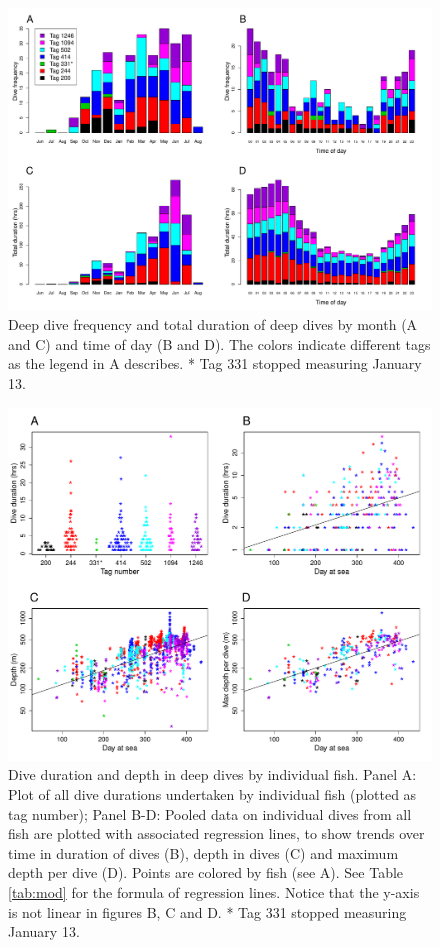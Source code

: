 \begin{figure}[ht]
  \centering
  \includegraphics[width=\linewidth]{fig2}
  \caption{Deep dive frequency and total duration of deep dives by month (A and C) and time of day (B and D). The colors indicate different tags as the legend in A describes. * Tag 331 stopped measuring January 13.}
  \label{fig:freq}
\end{figure}

\begin{figure}[ht]
  \centering
  \includegraphics[width=\linewidth]{fig3}
  \caption{Dive duration and depth in deep dives by individual fish.
Panel A: Plot of all dive durations undertaken by individual fish (plotted as tag number); 
Panel B-D: Pooled data on individual dives from all fish are plotted with associated regression lines, to show trends over time in duration of dives (B), depth in dives (C) and maximum depth per dive (D).
Points are colored by fish (see A). 
See Table \ref{tab:mod} for the formula of regression lines. 
Notice that the y-axis is not linear in figures B, C and D. 
* Tag 331 stopped measuring January 13.}
  \label{fig:lendep}
\end{figure}

